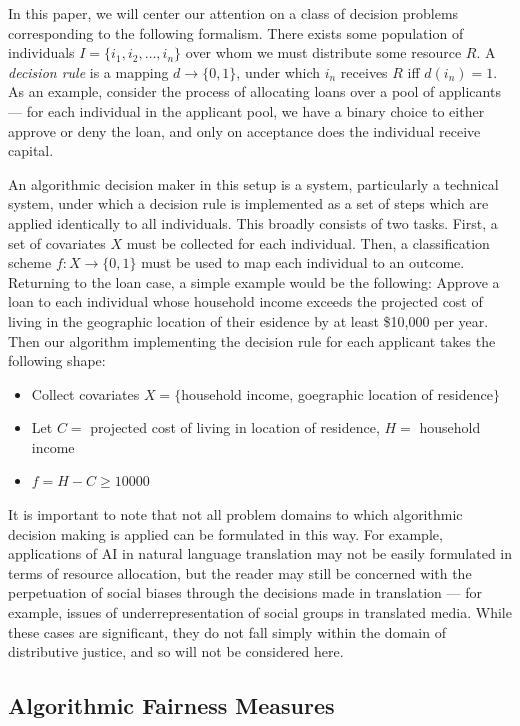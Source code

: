 In this paper, we will center our attention on a class of decision problems
corresponding to the following formalism. There exists some population of 
individuals $I = \{i_1, i_2, \ldots, i_n\}$ over whom we must distribute some
resource $R$. A \textit{decision rule} is a mapping $d \rightarrow \{0, 1\}$,
under which $i_n$ receives $R$ iff $d(i_n) = 1$. As an example, consider the
process of allocating loans over a pool of applicants — for each individual in
the applicant pool, we have a binary choice to either approve or deny the loan,
and only on acceptance does the individual receive capital.

An algorithmic decision maker in this setup is a system, particularly a
technical system, under which a decision rule is implemented as a set of steps
which are applied identically to all individuals. This broadly consists of two
tasks. First, a set of covariates $X$ must be collected for each individual.
Then, a classification scheme $f: X \rightarrow \{0, 1\}$ must be used to map
each individual to an outcome. Returning to the loan case, a simple example
would be the following: Approve a loan to each individual whose household
income exceeds the projected cost of living in the geographic location of their 
esidence by at least \$10,000 per year. Then our algorithm implementing the
decision rule for each applicant takes the following shape:
\begin{itemize}
    \item Collect covariates $X=\{$household income, goegraphic location of residence$\}$
    \item Let $C =$ projected cost of living in location of residence, $H =$
          household income
    \item $f = H - C \geq 10000$
\end{itemize}

It is important to note that not all problem domains to which algorithmic
decision making is applied can be formulated in this way. For example,
applications of AI in natural language translation may not be easily formulated
in terms of resource allocation, but the reader may still be concerned with the
perpetuation of social biases through the decisions made in translation — for
example, issues of underrepresentation of social groups in translated media.  
While these cases are significant, they do not fall simply within the domain of
distributive justice, and so will not be considered here.

\subsection{Algorithmic Fairness Measures}\label{sec:fairness-measures}

